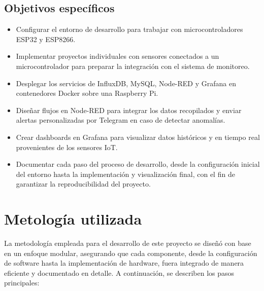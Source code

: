     \subsection*{Objetivos específicos}
    \begin{itemize}
        \item Configurar el entorno de desarrollo para trabajar con microcontroladores ESP32 y ESP8266.
        \item Implementar proyectos individuales con sensores conectados a un microcontrolador para preparar la integración con el sistema de monitoreo.
        \item Desplegar los servicios de InfluxDB, MySQL, Node-RED y Grafana en contenedores Docker sobre una Raspberry Pi.
        \item Diseñar flujos en Node-RED para integrar los datos recopilados y enviar alertas personalizadas por Telegram en caso de detectar anomalías.
        \item Crear dashboards en Grafana para visualizar datos históricos y en tiempo real provenientes de los sensores IoT.
        \item Documentar cada paso del proceso de desarrollo, desde la configuración inicial del entorno hasta la implementación y visualización final, con el fin de garantizar la reproducibilidad del proyecto.
    \end{itemize}

\section{Metología utilizada}

La metodología empleada para el desarrollo de este proyecto se diseñó con base en un enfoque modular, asegurando que cada componente, desde la configuración de software hasta la implementación de hardware, fuera integrado de manera eficiente y documentado en detalle. A continuación, se describen los pasos principales:


